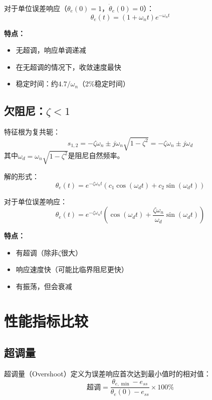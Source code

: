 \documentclass[12pt,a4paper]{article}
\begin{document}
对于单位误差响应（$\theta_e(0) = 1$，$\dot{\theta}_e(0) = 0$）：
\begin{equation}
\theta_e(t) = (1 + \omega_n t)e^{-\omega_n t}
\end{equation}

\textbf{特点：}
\begin{itemize}
\item 无超调，响应单调递减
\item 在无超调的情况下，收敛速度最快
\item 稳定时间：约$4.7/\omega_n$（2\%稳定时间）
\end{itemize}

\subsection{欠阻尼：$\zeta < 1$}

特征根为复共轭：
\begin{equation}
s_{1,2} = -\zeta\omega_n \pm j\omega_n\sqrt{1 - \zeta^2} = -\zeta\omega_n \pm j\omega_d
\end{equation}
其中$\omega_d = \omega_n\sqrt{1 - \zeta^2}$是阻尼自然频率。

解的形式：
\begin{equation}
\theta_e(t) = e^{-\zeta\omega_n t}(c_1 \cos(\omega_d t) + c_2 \sin(\omega_d t))
\end{equation}

对于单位误差响应：
\begin{equation}
\theta_e(t) = e^{-\zeta\omega_n t}\left(\cos(\omega_d t) + \frac{\zeta\omega_n}{\omega_d}\sin(\omega_d t)\right)
\end{equation}

\textbf{特点：}
\begin{itemize}
\item 有超调（除非$\zeta$很大）
\item 响应速度快（可能比临界阻尼更快）
\item 有振荡，但会衰减
\end{itemize}

\section{性能指标比较}

\subsection{超调量}

超调量（Overshoot）定义为误差响应首次达到最小值时的相对值：
\begin{equation}
\text{超调} = \frac{\theta_{e,\min} - e_{ss}}{\theta_e(0) - e_{ss}} \times 100\%
\end{equation}
\end{document}
